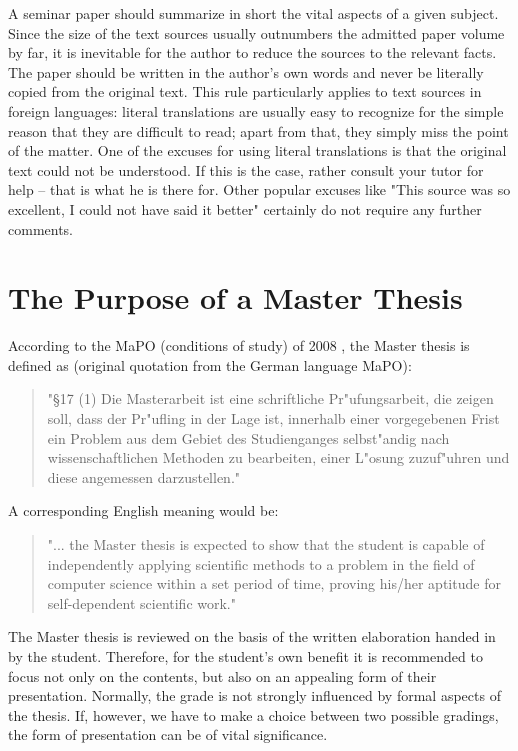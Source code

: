 A seminar paper should summarize in short the vital aspects of a given subject.
Since the size of the text sources usually outnumbers the admitted paper volume by
far, it is inevitable for the author to reduce the sources to the relevant facts.
The paper should be written in the author's own words and never be literally copied
from the original text. This rule particularly applies to text sources in foreign
languages: literal translations are usually easy to recognize for the simple reason
that they are difficult to read; apart from that, they simply miss the point of the
matter. One of the excuses for using literal translations is that the original text
could not be understood. If this is the case, rather consult your tutor for help --
that is what he is there for. Other popular excuses like "This source was so
excellent, I could not have said it better" certainly do not require any further comments.


\section{The Purpose of a Master Thesis}
\label{sec:aufgaben-diplom}

According to the MaPO (conditions of study) of 2008 \cite{mpo08}, the Master thesis
is defined as (original quotation from the German language MaPO):

\begin{quotation}
  "\S 17 (1) Die Masterarbeit ist eine schriftliche Pr"ufungsarbeit, die zeigen soll, 
  dass der Pr"ufling in der Lage ist, innerhalb einer vorgegebenen Frist ein Problem aus
  dem Gebiet des Studienganges selbst"andig nach wissenschaftlichen Methoden zu bearbeiten,
  einer L"osung zuzuf"uhren und diese angemessen darzustellen."
\end{quotation}

A corresponding English meaning would be:

\begin{quotation}
  "... the Master thesis is expected to show that the student is capable of 
  independently applying scientific methods 
  to a problem in the field of computer science within a set period of time,
  proving his/her aptitude for self-dependent scientific work."
\end{quotation}

The Master thesis is reviewed on the basis of the written elaboration handed in by
the student. Therefore, for the student's own benefit it is recommended to focus not
only on the contents, but also on an appealing form of their presentation. Normally,
the grade is not strongly influenced by formal aspects of the thesis. If, however,
we have to make a choice between two possible gradings, the form of presentation can
be of vital significance.
